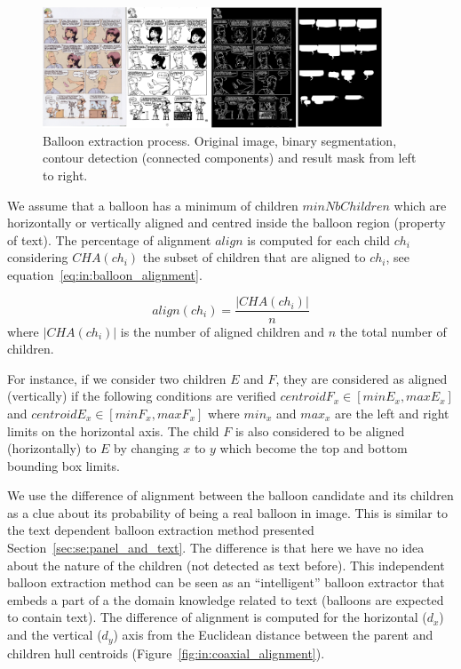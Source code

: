  \begin{figure}[!ht]  %
   \centering
  \includegraphics[width=0.9\textwidth]{closed_balloon_process.png}
  \caption[Balloon extraction process]{Balloon extraction process. Original image, binary segmentation, contour detection (connected components) and result mask from left to right.}
  \label{fig:in:balloon_binarisation}
 \end{figure}

We assume that a balloon has a minimum of children $minNbChildren$ which are horizontally or vertically aligned and centred inside the balloon region (property of text).
The percentage of alignment $align$ is computed for each child $ch_i$ considering $CHA(ch_i)$ the subset of children that are aligned to $ch_i$, see equation~\ref{eq:in:balloon_alignment}.

\begin{equation}
	\label{eq:in:balloon_alignment}
	align(ch_i) = \frac{|CHA(ch_i)|}{n}
\end{equation}
where $|CHA(ch_i)|$ is the number of aligned children and $n$ the total number of children.


For instance, if we consider two children $E$ and $F$, they are considered as aligned (vertically) if the following conditions are verified $centroidF_x \in [minE_x, maxE_x]$ and $centroidE_x \in [minF_x, maxF_x]$ where $min_x$ and $max_x$ are the left and right limits on the horizontal axis.
The child $F$ is also considered to be aligned (horizontally) to $E$ by changing $x$ to $y$ which become the top and bottom bounding box limits.

We use the difference of alignment between the balloon candidate and its children as a clue about its probability of being a real balloon in image.
This is similar to the text dependent balloon extraction method presented Section~\ref{sec:se:panel_and_text}.
The difference is that here we have no idea about the nature of the children (not detected as text before).
This independent balloon extraction method can be seen as an ``intelligent'' balloon extractor that embeds a part of a the domain knowledge related to text (balloons are expected to contain text).
The difference of alignment is computed for the horizontal ($d_x$) and the vertical ($d_y$) axis from the Euclidean distance between the parent and children hull centroids (Figure~\ref{fig:in:coaxial_alignment}).


